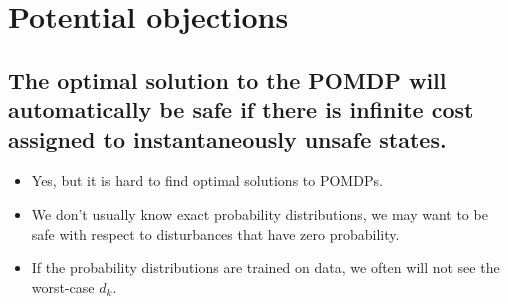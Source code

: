 \documentclass{article}
\begin{document}
\section{Potential objections}

\subsection{The optimal solution to the POMDP will automatically be safe if there is infinite cost assigned to instantaneously unsafe states.}

\begin{itemize}
    \item Yes, but it is hard to find optimal solutions to POMDPs.
    \item We don't usually know exact probability distributions, we may want to be safe with respect to disturbances that have zero probability.
    \item If the probability distributions are trained on data, we often will not see the worst-case $d_k$.
\end{itemize}
\end{document}
